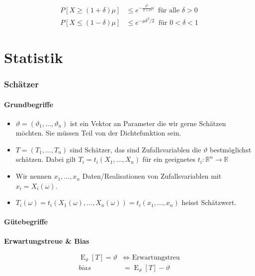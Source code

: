 \documentclass[25pt]{sciposter}
\newcommand{\R}{\mathbb{R}}
\newcommand{\E}{\operatorname{E}}
\newenvironment{method}[1]{\begin{mdframed}[backgroundcolor=blue!10,innertopmargin=15pt, innerbottommargin=15pt,nobreak=true]
		\textbf{#1 }
	}
	{ 
	\end{mdframed}
}
\begin{document}
\begin{multicols}{3}
		\begin{align*}
			P[X \geq (1+\delta)\mu] &\leq e^{-\frac{\delta^2}{2+\delta}\mu} \ \text{ für alle } \delta > 0  \\
			P[X \leq (1-\delta)\mu] &\leq e^{-\mu\delta^2/2} \ \text{ für } 0 < \delta < 1
		\end{align*}
		
		
		
		\part{Statistik}
		
		\section{Schätzer}
		\subsection*{Grundbegriffe}
		
		\begin{itemize}
			\item $\vartheta =  (\vartheta_1,\ldots,\vartheta_n)$ ist ein Vektor an Parameter die wir gerne Schätzen möchten. Sie müssen Teil von der Dichtefunktion sein.
			\item $T = (T_1,\ldots,T_n)$ sind Schätzer, das sind Zufallsvariablen die $\vartheta$ bestmöglichst schätzen. Dabei gilt $T_i = t_i(X_1,\ldots,X_n)$ für ein geeignetes $t_i:\R^n \to \R$
			\item Wir nennen $x_1,\ldots,x_n$ Daten/Realisationen von Zufallsvariablen mit $x_i = X_i(\omega)$.
			\item $T_i(\omega) = t_i(X_1(\omega), \ldots, X_n(\omega)) = t_i(x_1,\ldots,x_n) $ heisst Schätzwert.
		\end{itemize}
		
		\subsection*{Gütebegriffe}
		
		\begin{method}{Erwartungstreue \& Bias}
			\begin{align*}
				\E_\vartheta[T] = \vartheta &\iff \text{ Erwartungstreu}\\
				bias &= \E_\vartheta[T] - \vartheta
			\end{align*}
		\end{method}
		

\end{multicols}
\end{document}
